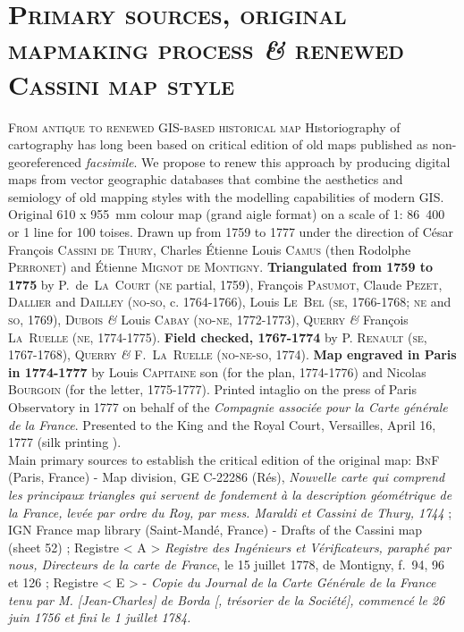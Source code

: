 \documentclass[portrait,a0]{sciposter}
\begin{document}
\begin{minipage}[b]{\textwidth}
  \section{\normalfont \textsc{Primary sources, original mapmaking process \textit{\&} renewed Cassini map style}}
  \begin{multicols}{3}
    \setlength{\columnsep}{80pt}
    \textsc{From antique to renewed GIS-based historical map}
    \vfill
     \normalsize \lettrine{H}istoriography of cartography has long been based on critical edition of old maps published as non-georeferenced \textit{facsimile}. We propose to renew this approach by producing digital maps from vector geographic databases that combine the aesthetics and semiology of old mapping styles with the modelling capabilities of modern GIS.
    \vfill
    \small
    Original 610 x 955~mm colour map (\og grand aigle \fg format) on a scale of 1: 86~400 or 1 line for 100 toises. Drawn up from 1759 to 1777 under the direction of César François \textsc{Cassini de Thury}, Charles Étienne Louis \textsc{Camus} (then Rodolphe \textsc{Perronet}) and Étienne \textsc{Mignot de Montigny}. \textbf{Triangulated from 1759 to 1775} by P.~de~\textsc{La~Court} (\textsc{ne} partial, 1759), François \textsc{Pasumot}, Claude \textsc{Pezet}, \textsc{Dallier} and \textsc{Dailley} (\textsc{no-so}, c. 1764-1766), Louis \textsc{Le~Bel} (\textsc{se}, 1766-1768; \textsc{ne} and \textsc{so}, 1769), \textsc{Dubois} \textit{\&} Louis \textsc{Cabay} (\textsc{no-ne}, 1772-1773), Q\textsc{uerry} \textit{\&} François \textsc{La~Ruelle} (\textsc{ne}, 1774-1775). \textbf{Field checked, 1767-1774} by P. \textsc{Renault} (\textsc{se}, 1767-1768), Q\textsc{uerry} \textit{\&} F.~\textsc{La~Ruelle} (\textsc{no-ne-so}, 1774). \textbf{Map engraved in Paris in 1774-1777} by Louis \textsc{Capitaine} son (for the plan, 1774-1776) and Nicolas \textsc{Bourgoin} (for the letter, 1775-1777). Printed intaglio on the press of Paris Observatory in 1777 on behalf of the \textit{Compagnie associée pour la Carte générale de la France}. Presented to the King and the Royal Court, Versailles, April 16, 1777 (\og silk printing \fg).\\
    \vfill
    \scriptsize Main primary sources to establish the critical edition of the original map: \textsc{BnF} (Paris, France) - Map division, GE C-22286 (Rés), \textit{Nouvelle carte qui comprend les principaux triangles qui servent de fondement à la description géométrique de la France, levée par ordre du Roy, par mess. Maraldi et Cassini de Thury, 1744} ; IGN France map library (Saint-Mandé, France) - Drafts of the Cassini map (sheet 52) ; Registre < A > \textit{Registre des Ingénieurs et Vérificateurs, paraphé par nous, Directeurs de la carte de France}, le 15 juillet 1778, de Montigny, f.~94, 96 et 126 ; Registre  < E > - \textit{Copie du Journal de la Carte Générale de la France tenu par M. [Jean-Charles] de Borda [, trésorier de la Société], commencé le 26 juin 1756 et fini le 1 juillet 1784.}

\end{multicols}
\end{minipage}
\end{document}
